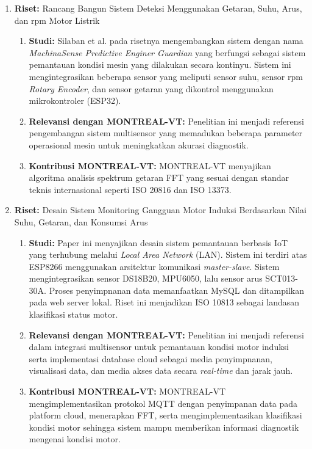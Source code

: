 \documentclass{elsinta}
\begin{document}
\begin{enumerate}
\begin{enumerate}
        \item \textbf{Kontribusi MONTREAL-VT:} MONTREAL-VT menerapkan pemrosesan sinyal getaran seperti pemfilteran, penguatan, dan konversi data getaran domain waktu ke domain frekuensi yang diintegrasikan model klasifikasi keparahan getaran ISO 20816-1:2016.
    \end{enumerate}
    \item \textbf{Riset:} Rancang Bangun Sistem Deteksi Menggunakan Getaran, Suhu, Arus, dan rpm Motor Listrik\cite{2.1.8}
    \begin{enumerate}
        \item \textbf{Studi:} Silaban et al. pada risetnya mengembangkan sistem dengan nama \textit{MachinaSense Predictive Enginer Guardian} yang berfungsi sebagai sistem pemantauan kondisi mesin yang dilakukan secara kontinyu. Sistem ini mengintegrasikan beberapa sensor yang meliputi sensor suhu, sensor rpm \textit{Rotary Encoder}, dan sensor getaran yang dikontrol menggunakan mikrokontroler (ESP32).
        \item \textbf{Relevansi dengan MONTREAL-VT:} Penelitian ini menjadi referensi pengembangan sistem multisensor yang memadukan beberapa parameter operasional mesin untuk meningkatkan akurasi diagnostik.
        \item \textbf{Kontribusi MONTREAL-VT:} MONTREAL-VT menyajikan algoritma analisis spektrum getaran FFT yang sesuai dengan standar teknis internasional seperti ISO 20816 dan ISO 13373.
    \end{enumerate}
    \item \textbf{Riset:} Desain Sistem Monitoring Gangguan Motor Induksi Berdasarkan Nilai Suhu, Getaran, dan Konsumsi Arus\cite{2.1.9}
    \begin{enumerate}
        \item \textbf{Studi:} Paper ini menyajikan desain sistem pemantauan berbasis IoT yang terhubung melalui \textit{Local Area Network }(LAN). Sistem ini terdiri atas ESP8266 menggunakan arsitektur komunikasi \textit{master-slave}. Sistem mengintegrasikan sensor DS18B20, MPU6050, lalu sensor arus SCT013-30A. Proses penyimpnanan data memanfaatkan MySQL dan ditampilkan pada web server lokal. Riset ini menjadikan ISO 10813 sebagai landasan klasifikasi status motor.
        \item \textbf{Relevansi dengan MONTREAL-VT:} Penelitian ini menjadi referensi dalam integrasi multisensor untuk pemantauan kondisi motor induksi serta implementasi database cloud sebagai media penyimpnanan, visualisasi data, dan media akses data secara \textit{real-time} dan jarak jauh.
        \item \textbf{Kontribusi MONTREAL-VT:} MONTREAL-VT mengimplementasikan protokol MQTT dengan penyimpanan data pada platform cloud, menerapkan FFT, serta mengimplementasikan klasifikasi kondisi motor sehingga sistem mampu memberikan informasi diagnostik mengenai kondisi motor.
    \end{enumerate}
\end{enumerate}
\end{document}

